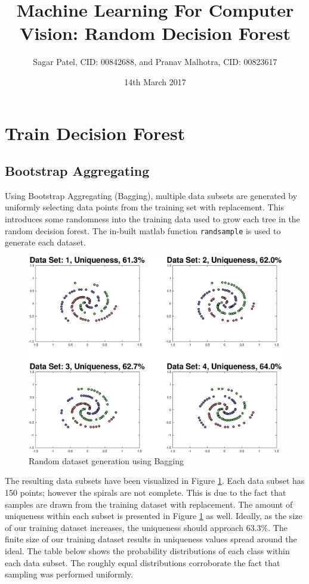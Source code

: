 \documentclass[a4paper,pra,twocolumn,10pt,aps,longbibliography,nobalancelastpage]{article}
\begin{document}
\title{Machine Learning For Computer Vision: Random Decision Forest}
\author{Sagar Patel, CID: 00842688, and Pranav Malhotra, CID: 00823617}
\date{14th March 2017}

\maketitle

\section{Train Decision Forest}\label{sec:train}

\subsection{Bootstrap Aggregating}
Using Bootstrap Aggregating (Bagging), multiple data subsets are generated by uniformly selecting data points from the training set with replacement. This introduces some randomness into the
training data used to grow each tree in the random decision forest. The in-built matlab function \texttt{randsample} is used to generate each dataset. 

\begin{figure}[H]
	\centering
    \includegraphics[width=0.60\columnwidth]{boot_strap}
    \caption{Random dataset generation using Bagging}
    \label{fig:boot_strap}
\end{figure}

The resulting data subsets have been visualized in Figure \ref{fig:boot_strap}. Each data subset has 150 points; however the spirals are not complete. This is due to the fact that samples are drawn from the training dataset with replacement. The amount of uniqueness within each subset is presented in Figure \ref{fig:boot_strap} as well.  Ideally, as the size of our training dataset increases, the uniqueness should approach $63.3\%$. The finite size of our training dataset results in uniqueness values spread around the ideal. The table below shows the probability distributions of each class within each data subset. The roughly equal distributions corroborate the fact that sampling was performed uniformly.
\end{document}

